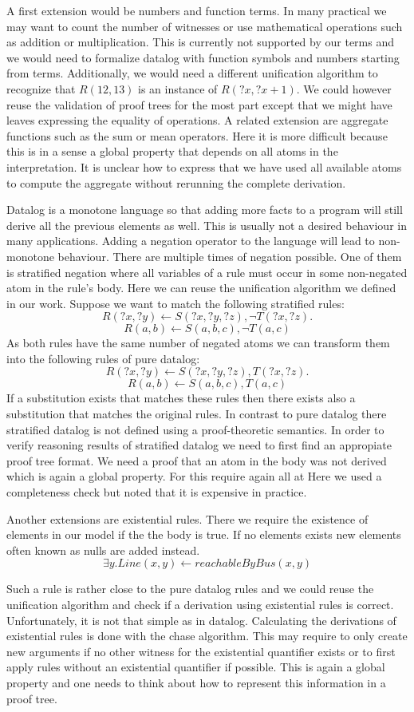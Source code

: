 A first extension would be numbers and function terms. In many practical we may want to count the number of witnesses or use mathematical operations such as addition or multiplication. This is currently not supported by our terms and we would need to formalize datalog with function symbols and numbers starting from terms. Additionally, we would need a different unification algorithm to recognize that $R(12, 13)$ is an instance of $R(?x, ?x + 1)$. We could however reuse the validation of proof trees for the most part except that we might have leaves expressing the equality of operations. A related extension are aggregate functions such as the sum or mean operators. Here it is more difficult because this is in a sense a global property that depends on all atoms in the interpretation. It is unclear how to express that we have used all available atoms to compute the aggregate without rerunning the complete derivation.


Datalog is a monotone language so that adding more facts to a program will still derive all the previous elements as well. This is usually not a desired behaviour in many applications. Adding a negation operator to the language will lead to non-monotone behaviour. There are multiple times of negation possible. One of them is stratified negation where all variables of a rule must occur in some non-negated atom in the rule's body. Here we can reuse the unification algorithm we defined in our work. Suppose we want to match the following stratified rules: 
    \[ R(?x,?y) \leftarrow S(?x, ?y, ?z), \neg T(?x, ?z). \]
    \[ R(a,b) \leftarrow S(a, b, c), \neg T(a, c) \]
As both rules have the same number of negated atoms we can transform them into the following rules of pure datalog:
    \[ R(?x,?y) \leftarrow S(?x, ?y, ?z), T(?x, ?z). \]
    \[ R(a,b) \leftarrow S(a, b, c), T(a, c) \]
If a substitution exists that matches these rules then there exists also a substitution that matches the original rules. In contrast to pure datalog there stratified datalog is not defined using a proof-theoretic semantics\cite{alice}. In order to verify reasoning results of stratified datalog we need to first find an appropiate proof tree format. We need a proof that an atom in the body was not derived which is again a global property. For this require again all at Here we used a completeness check but noted that it is expensive in practice. 

Another extensions are existential rules. There we require the existence of elements in our model if the the body is true. If no elements exists new elements often known as nulls are added instead.
\[ \exists y. Line(x,y) \leftarrow reachableByBus(x,y)\]

Such a rule is rather close to the pure datalog rules and we could reuse the unification algorithm and check if a derivation using existential rules is correct. Unfortunately, it is not that simple as in datalog. Calculating the derivations of existential rules is done with the chase algorithm. This may require to only create new arguments if no other witness for the existential quantifier exists or to first apply rules without an existential quantifier if possible. This is again a global property and one needs to think about how to represent this information in a proof tree.


